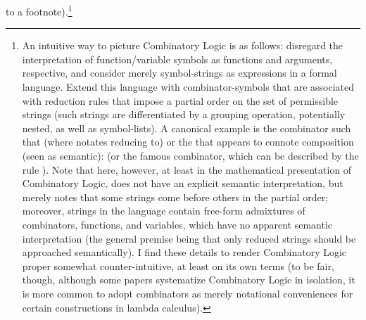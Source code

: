 {to a footnote).\footnote{An intuitive way to picture Combinatory
Logic is as follows: disregard the interpretation
of function/variable symbols as functions and
arguments, respective, and consider merely
symbol-strings as expressions in a formal
language. \> Extend this language
with combinator-symbols that are associated
with reduction rules that impose a
partial order on the set of permissible
strings (such strings are differentiated
by a grouping operation, potentially nested,
as well as symbol-lists). \> A canonical
example is the \Scomb{} combinator such
that \Sfgx{} \reduces{} \fxparengx{} (where \reduces{} notates
reducing to) or the \Bcomb{} that appears to connote
composition (seen as semantic): \Bfgx{} \reduces{}
\fparengx{} (or the famous  combinator,
which can be described by the rule \YgreducgYg{}).
\> Note that  here, however, at least
in the mathematical presentation of Combinatory
Logic, does not have an explicit semantic
interpretation, but merely notes that
some strings come before others in the
\reduces{} partial order; moreover,
strings in the language contain
free-form admixtures of combinators, functions, and
variables, which have no apparent semantic
interpretation (the general premise being
that only  reduced strings should
be approached semantically). \> I find these
details to render Combinatory Logic proper
somewhat counter-intuitive, at least on
its own terms (to be fair, though,
although some papers systematize Combinatory Logic
in isolation, it is more common to adopt
combinators as merely notational conveniences
for certain constructions in lambda calculus).\;\<
}
}


